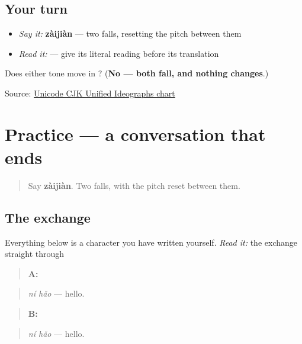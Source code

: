 \subsection*{Your turn}
\begin{itemize}
\raggedright
  \item \emph{Say it:} \textbf{zàijiàn} — two falls, resetting the pitch between them
  \item \emph{Read it:}  — give its literal reading before its translation
\end{itemize}

\begin{tcolorbox}[breakable,colback=teal!4,colframe=teal!35!black,title={Before you move on}]
Does either tone move in ? (\textbf{No — both fall, and nothing changes}.)

Source: \href{https://www.unicode.org/charts/PDF/U4E00.pdf}{Unicode CJK Unified Ideographs chart}
\end{tcolorbox}
\section[Practice]{Practice — a conversation that ends}

\label{lesson:ZH-C06-practice}



\begin{quote}
Say \textbf{zàijiàn}. Two falls, with the pitch reset between them.
\end{quote}

\subsection*{The exchange}
Everything below is a character you have written yourself. \emph{Read it:} the exchange straight through

\begin{quote}
\textbf{A:} 
\end{quote}

\begin{quote}
\emph{ní hǎo} — hello.
\end{quote}

\begin{quote}
\textbf{B:} 
\end{quote}

\begin{quote}
\emph{ní hǎo} — hello.
\end{quote}

